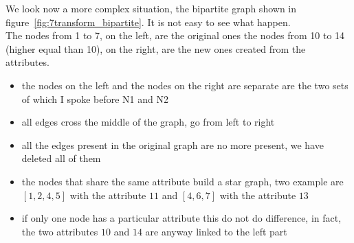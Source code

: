 %
We look now a more complex situation, the bipartite graph shown in figure~\ref{fig:7transform_bipartite}. It is not easy to see what happen.\\
The nodes from 1 to 7, on the left, are the original ones the nodes from 10 to 14 (higher equal than 10), on the right, are the new ones created from the attributes. 
\begin{itemize}
	\item the nodes on the left and the nodes on the right are separate are the two sets of which I spoke before N1 and N2
	\item all edges cross the middle of the graph, go from left to right
	\item all the edges present in the original graph are no more present, we have deleted all of them
	\item the nodes that share the same attribute build a star graph, two example are $[1,2,4,5]$ with the attribute $11$ and $[4,6,7]$ with the attribute $13$
	\item  if only one node has a particular attribute this do not do difference, in fact, the two attributes $10$ and $14$ are anyway linked to the left part
\end{itemize}
%
%
%
%
